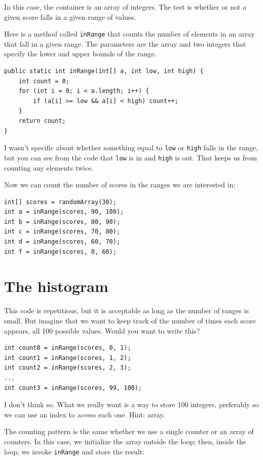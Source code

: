 \documentclass[12pt]{book}
\theoremstyle{exercise}
\begin{document}
In this case, the container is an array of integers.  The
test is whether or not a given score falls in a given range of
values.

Here is a method called {\tt inRange} that counts the number of
elements in an array that fall in a given range.  The parameters are
the array and two integers that specify the lower and upper bounds of
the range.

\begin{lstlisting}
public static int inRange(int[] a, int low, int high) {
    int count = 0;
    for (int i = 0; i < a.length; i++) {
        if (a[i] >= low && a[i] < high) count++;
    }
    return count;
}
\end{lstlisting}
%
I wasn't specific about whether something equal
to {\tt low} or {\tt high} falls in the range, but you can
see from the code that {\tt low} is in and {\tt high} is out.
That keeps us from counting any elements twice.

Now we can count the number of scores in the ranges we are
interested in:

\begin{lstlisting}
int[] scores = randomArray(30);
int a = inRange(scores, 90, 100);
int b = inRange(scores, 80, 90);
int c = inRange(scores, 70, 80);
int d = inRange(scores, 60, 70);
int f = inRange(scores, 0, 60);
\end{lstlisting}


\section{The histogram}

This code is repetitious, but it is acceptable as
long as the number of ranges is small.  But imagine that
we want to keep track of the number of times each score appears,
all 100 possible values.  Would you want to write this?

\begin{lstlisting}
int count0 = inRange(scores, 0, 1);
int count1 = inRange(scores, 1, 2);
int count2 = inRange(scores, 2, 3);
...
int count3 = inRange(scores, 99, 100);
\end{lstlisting}

I don't think so.  What we really want is a way to store 100 integers,
preferably so we can use an index to access each one.  Hint: array.

The counting pattern is the same whether we use a single counter or an
array of counters.  In this case, we initialize the array outside the
loop; then, inside the loop, we invoke {\tt inRange} and store the
result:
\end{document}
